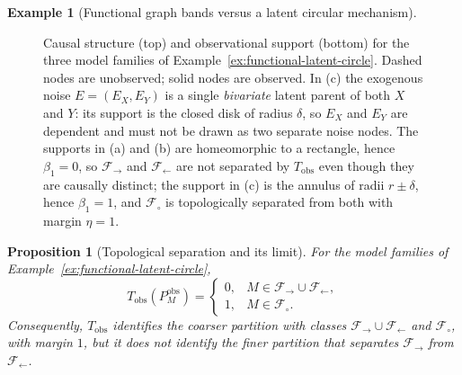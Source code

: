 \documentclass[11pt,a4paper]{article}
\theoremstyle{plain}
\newtheorem{proposition}[theorem]{Proposition}
\theoremstyle{definition}
\newtheorem{example}[theorem]{Example}
\theoremstyle{remark}
\newcommand{\1}{\mathbbm{1}}
\begin{document}
\begin{example}[Functional graph bands versus a latent circular mechanism]
\begin{figure}[ht]
\caption{Causal structure (top) and observational support (bottom) for the three model families of Example~\ref{ex:functional-latent-circle}. Dashed
nodes are unobserved; solid nodes are observed. In (c) the exogenous noise $E=(E_X,E_Y)$ is a single \emph{bivariate} latent parent of both $X$ and $Y$: its support is the closed disk of radius $\delta$, so $E_X$ and $E_Y$
are dependent and must not be drawn as two separate noise nodes. The supports in (a) and (b) are homeomorphic to a rectangle, hence $\beta_1=0$, so $\mathcal F_\to$ and $\mathcal F_\leftarrow$ are not separated by $T_{\mathrm{obs}}$ even though they are causally distinct; the
support in (c) is the annulus of radii $r\pm\delta$, hence $\beta_1=1$, and $\mathcal F_\circ$ is topologically separated from both with margin $\eta=1$.}
\label{fig:dag-topological-separation}
\end{figure}

\end{example}



\begin{proposition}[Topological separation and its limit]
\label{prop:functional-circle-separation}
For the model families of Example~\ref{ex:functional-latent-circle},
\[
T_{\mathrm{obs}}(P_M^{\mathrm{obs}})
=
\begin{cases}
0,
&
M\in\mathcal F_\to\cup\mathcal F_\leftarrow,
\\
1,
&
M\in\mathcal F_\circ.
\end{cases}
\]
Consequently, \(T_{\mathrm{obs}}\) identifies the coarser
partition with classes
\(\mathcal F_\to\cup\mathcal F_\leftarrow\) and
\(\mathcal F_\circ\), with margin \(1\), but it does not
identify the finer partition that separates
\(\mathcal F_\to\) from \(\mathcal F_\leftarrow\).
\end{proposition}
\end{document}
